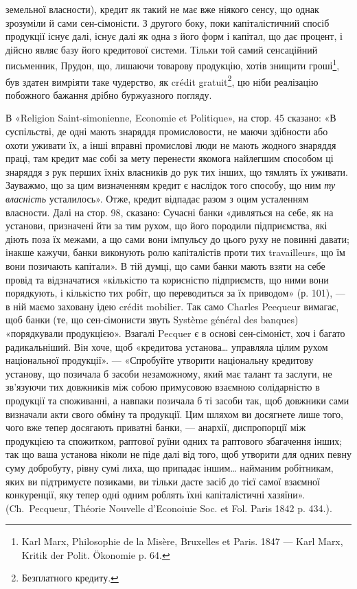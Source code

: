 \parcont{}  %
земельної власности), кредит як такий не має вже ніякого сенсу, що однак
зрозуміли й сами сен-сімоністи. З другого боку, поки капіталістичний спосіб
продукції існує далі, існує далі як одна з його форм і капітал, що дає процент,
і дійсно являє базу його кредитової системи. Тільки той самий сенсаційний письменник,
Прудон, що, лишаючи товарову продукцію, хотів знищити гроші\footnote{
Karl Marx, Philosophie de la Misère, Bruxelles et Paris. 1847 — Karl Marx, Kritik der Polit.
Ökonomie p. 64.
},
був здатен вимріяти таке чудерство, як crédit gratuit\footnote*{
Безплатного кредиту. 
}, цю ніби реалізацію побожного
бажання дрібно буржуазного погляду.

В «Religion Saint-simonienne, Economie et Politique», на стор. 45 сказано:
«В суспільстві, де одні мають знаряддя промисловости, не маючи здібности або
охоти уживати їх, а інші вправні промислові люди не мають жодного знаряддя
праці, там кредит має собі за мету перенести якомога найлегшим способом
ці знаряддя з рук перших їхніх власників до рук тих інших, що тямлять їх
уживати. Зауважмо, що за цим визначенням кредит є наслідок того способу, що
ним \emph{ту власність} усталилось». Отже, кредит відпадає разом з оцим усталенням
власности. Далі на стор. 98, сказано: Сучасні банки «дивляться на себе, як на
установи, призначені йти за тим рухом, що його породили підприємства, які діють
поза їх межами, а що сами вони імпульсу до цього руху не повинні давати; інакше
кажучи, банки виконують ролю капіталістів проти тих travailleurs, що їм вони позичають
капітали». В тій думці, що сами банки мають взяти на себе провід та відзначатися
«кількістю та корисністю підприємств, що ними вони порядкують, і кількістю
тих робіт, що переводиться за їх приводом» (р. 101), — в ній маємо заховану
ідею crédit mobilier. Так само Charles Peequeur вимагає, щоб банки (те, що сен-сімонисти
звуть Système général des banques) «порядкували продукцією». Взагалі Pecquer
є в основі сен-сімоніст, хоч і багато радикальніший. Він хоче, щоб «кредитова
установа\dots{} управляла цілим рухом національної продукції». — «Спробуйте
утворити національну кредитову установу, що позичала б засоби незаможному,
який має талант та заслуги, не зв’язуючи тих довжників між собою примусовою
взаємною солідарністю в продукції та споживанні, а навпаки позичала б
ті засоби так, щоб довжники сами визначали акти свого обміну та продукції.
Цим шляхом ви досягнете лише того, чого вже тепер досягають приватні банки, —
анархії, диспропорції між продукцією та спожитком, раптової руїни одних та
раптового збагачення інших; так що ваша установа ніколи не піде далі від того,
щоб утворити для одних певну суму добробуту, рівну сумі лиха, що припадає
іншим\dots{} найманим робітникам, яких ви підтримуєте позиками, ви тільки дасте
засіб до тієї самої взаємної конкуренції, яку тепер одні одним роблять їхні капіталістичні
хазяїни». (Ch.~Pecqueur, Théorie Nouvelle d’Econoiuie Soc. et Fol. Paris
1842 p. 434.).

